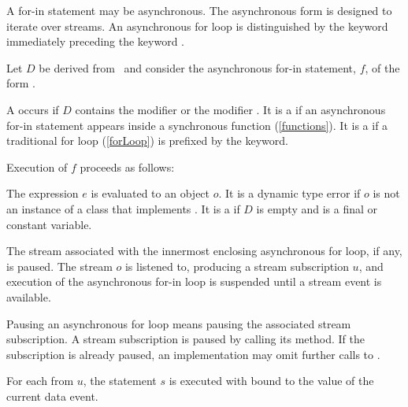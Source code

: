 \documentclass[makeidx]{article}
\begin{document}
\LMHash{}%
A for-in statement may be asynchronous.
The asynchronous form is designed to iterate over streams.
An asynchronous for loop is distinguished by
the keyword \AWAIT{} immediately preceding the keyword \FOR.

\LMHash{}%
Let $D$ be derived from \ and
consider the asynchronous for-in statement, $f$, of the form
.

\LMHash{}%
A  occurs if $D$ contains
the modifier \CONST{} or the modifier \LATE.
It is a  if an asynchronous for-in statement appears
inside a synchronous function (\ref{functions}).
It is a  if a traditional for loop (\ref{forLoop}) is
prefixed by the \AWAIT{} keyword.


\LMHash{}%
Execution of $f$ proceeds as follows:

\LMHash{}%
The expression $e$ is evaluated to an object $o$.
It is a dynamic type error if $o$ is not an instance of
a class that implements .
It is a  if $D$ is empty
and \id{} is a final or constant variable.

\LMHash{}%
The stream associated with the innermost enclosing asynchronous for loop,
if any, is paused.
The stream $o$ is listened to, producing a stream subscription $u$,
and execution of the asynchronous for-in loop is suspended
until a stream event is available.

Pausing an asynchronous for loop means pausing
the associated stream subscription.
A stream subscription is paused by calling its  method.
If the subscription is already paused, an implementation may omit
further calls to .


\LMHash{}%
For each  from $u$,
the statement $s$ is executed with \id{} bound to
the value of the current data event.

\end{document}
